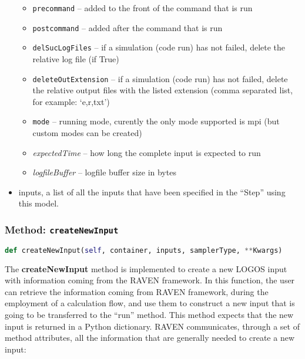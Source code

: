 \begin{itemize}
\begin{itemize}
    \item \texttt{precommand} -- added to the front of the command that is run
    \item \texttt{postcommand} -- added after the command that is run
    \item \texttt{delSucLogFiles} -- if a simulation (code run) has not failed,
    delete the relative log file (if True)
    \item \texttt{deleteOutExtension} -- if a simulation (code run) has not
    failed, delete the relative output files with the listed extension (comma
    separated list, for example: `e,r,txt')
    \item \texttt{mode} -- running mode, curently the only mode supported is
      mpi (but custom modes can be created)
    \item \textit{expectedTime} -- how long the complete input is expected to
    run
    \item \textit{logfileBuffer} -- logfile buffer size in bytes
  \end{itemize}
  \item inputs, a list of all the inputs that have been specified in the
  ``Step'' using this model.
\end{itemize}

\subsubsection{Method: \texttt{createNewInput}}
\label{subsubsec:externalCreateNewInputExternalModelPlugin}
\begin{lstlisting}[language=python]
  def createNewInput(self, container, inputs, samplerType, **Kwargs)
\end{lstlisting}
The \textbf{createNewInput} method is implemented to create a new LOGOS input
with information coming from the RAVEN framework. In this function, the user can
retrieve the information coming from RAVEN framework, during the employment of
a calculation flow, and use them to construct a new input that is going to be
transferred to the ``run'' method.
This method expects that the new input is returned in a Python dictionary.
RAVEN communicates, through a set of method attributes, all the information
that are generally needed to create a new input:

